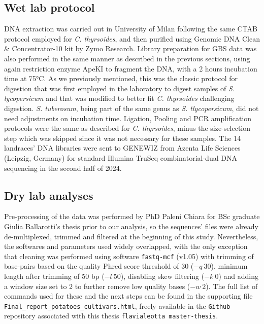 \documentclass[a4paper, 12pt]{report}
\begin{document}
\subsection{Wet lab protocol}
DNA extraction was carried out in University of Milan following the same CTAB protocol employed for \textit{C. thyrsoides}, and then purified using Genomic DNA Clean \& Concentrator-10 kit by Zymo Research. Library preparation for GBS data was also performed in the same manner as described in the previous sections, using again restriction enzyme ApeKI to fragment the DNA, with a 2 hours incubation time at 75°C. As we previously mentioned, this was the classic protocol for digestion that was first employed in the laboratory to digest samples of \textit{S. lycopersicum} and that was modified to better fit \textit{C. thyrsoides} challenging digestion. \textit{S. tuberosum}, being part of the same genus as \textit{S. tlycopersicum}, did not need adjustments on incubation time. Ligation, Pooling and PCR amplification protocols were the same as described for \textit{C. thyrsoides}, minus the size-selection step which was skipped since it was not necessary for these samples. The 14 landraces' DNA libraries were sent to GENEWIZ from Azenta Life Sciences (Leipzig, Germany) for standard Illumina TruSeq combinatorial-dual DNA sequencing in the second half of 2024.

\subsection{Dry lab analyses}
Pre-processing of the data was performed by PhD Paleni Chiara for BSc graduate Giulia Ballarotti's thesis \parencite{ballarottiSolanumTuberosumNel2025} prior to our analysis, so the sequences' files were already de-multiplexed, trimmed and filtered at the beginning of this study. Nevertheless, the softwares and parameters used widely overlapped, with the only exception that cleaning was performed using software \texttt{fastq-mcf} (v1.05) with trimming of base-pairs based on the quality Phred score threshold of 30 ($-q \ 30$), minimum length after trimming of 50 bp ($-l \ 50$), disabling skew filtering ($-k \ 0$) and adding a window size set to 2 to further remove low quality bases ($-w \ 2$). The full list of commands used for these and the next steps can be found in the supporting file \texttt{Final\_report\_potatoes\_cultivars.html}, freely available in the \texttt{Github} repository associated with this thesis \texttt{flavialeotta\ master-thesis}.
\end{document}
